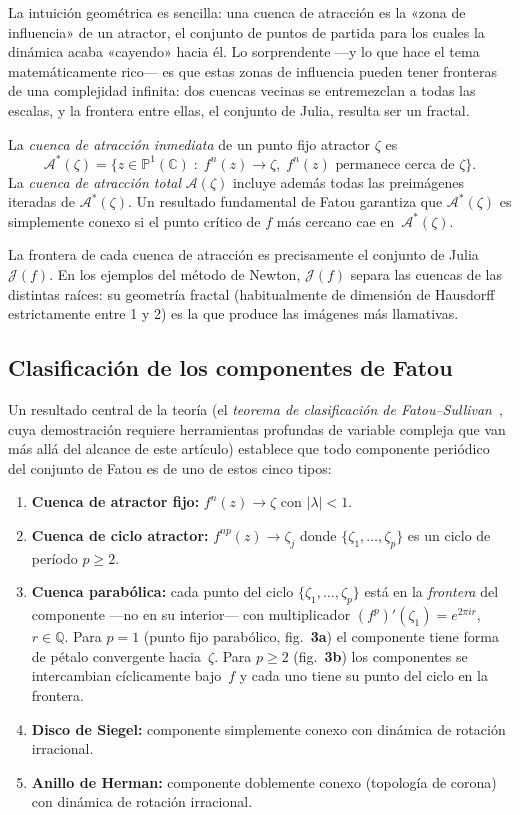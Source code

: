 \documentclass[11pt,a4paper]{article}
\theoremstyle{plain}
\theoremstyle{definition}
\theoremstyle{remark}
\newcommand{\Puno}{\mathbb{P}^1(\mathbb{C})}
\begin{document}
La intuición geométrica es sencilla: una cuenca de atracción es la «zona de influencia»
de un atractor, el conjunto de puntos de partida para los cuales la dinámica acaba
«cayendo» hacia él. Lo sorprendente ---y lo que hace el tema matemáticamente rico--- es
que estas zonas de influencia pueden tener fronteras de una complejidad infinita: dos
cuencas vecinas se entremezclan a todas las escalas, y la frontera entre ellas, el
conjunto de Julia, resulta ser un fractal.

La \emph{cuenca de atracción inmediata} de un punto fijo atractor
$\zeta$ es
\[
  \mathcal{A}^*(\zeta)=\{z\in\Puno\;:\;f^n(z)\to\zeta,\;
  f^n(z)\text{ permanece cerca de }\zeta\}.
\]
La \emph{cuenca de atracción total} $\mathcal{A}(\zeta)$ incluye
además todas las preimágenes iteradas de $\mathcal{A}^*(\zeta)$.
Un resultado fundamental de Fatou garantiza que $\mathcal{A}^*(\zeta)$
es simplemente conexo si el punto crítico de $f$ más cercano cae en~$\mathcal{A}^*(\zeta)$.

La frontera de cada cuenca de atracción es precisamente el conjunto
de Julia $\mathcal{J}(f)$.
En los ejemplos del método de Newton, $\mathcal{J}(f)$ separa las
cuencas de las distintas raíces: su geometría fractal (habitualmente
de dimensión de Hausdorff estrictamente entre 1 y 2) es la que produce
las imágenes más llamativas.

\subsection{Clasificación de los componentes de Fatou}

Un resultado central de la teoría (el \emph{teorema de clasificación de Fatou--Sullivan}~\cite{Milnor2006}, cuya demostración requiere herramientas profundas de variable compleja que van más allá del alcance de este artículo) establece que todo
componente periódico del conjunto de Fatou es de uno de estos cinco
tipos:

\begin{enumerate}
  \item \textbf{Cuenca de atractor fijo:} $f^n(z)\to\zeta$ con $|\lambda|<1$.
  \item \textbf{Cuenca de ciclo atractor:} $f^{np}(z)\to\zeta_j$ donde
        $\{\zeta_1,\ldots,\zeta_p\}$ es un ciclo de período $p\geq 2$.
  \item \textbf{Cuenca parabólica:} cada punto del ciclo
        $\{\zeta_1,\ldots,\zeta_p\}$ está en la \emph{frontera} del
        componente ---no en su interior--- con multiplicador
        $(f^p)'(\zeta_1)=e^{2\pi ir}$, $r\in\mathbb{Q}$.
        Para $p=1$ (punto fijo parabólico, fig.~\textbf{3a}) el componente
        tiene forma de pétalo convergente hacia~$\zeta$.
        Para $p\geq 2$ (fig.~\textbf{3b}) los componentes se intercambian
        cíclicamente bajo~$f$ y cada uno tiene su punto del ciclo en la
        frontera.
  \item \textbf{Disco de Siegel:} componente simplemente conexo con
        dinámica de rotación irracional.
  \item \textbf{Anillo de Herman:} componente doblemente conexo (topología de corona)
        con dinámica de rotación irracional.
\end{enumerate}
\end{document}
